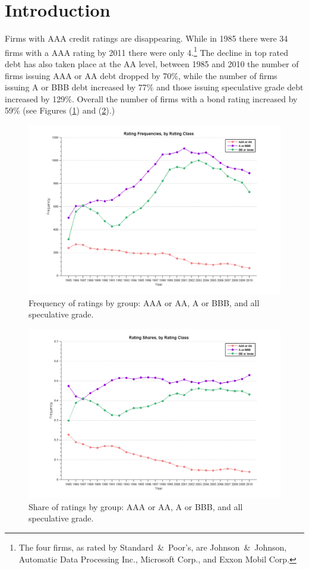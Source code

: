 \documentclass[titlepage]{article}
\begin{document}
\section{Introduction}
Firms with AAA credit ratings are disappearing. While in 1985 there were 34 firms with a AAA rating by 2011 there were only 4.\footnote{The four firms, as rated by Standard~\&~Poor's, are Johnson~\&~Johnson, Automatic Data Processing Inc., Microsoft Corp., and Exxon Mobil Corp.} The decline in top rated debt has also taken place at the AA level, between 1985 and 2010 the number of firms issuing AAA or AA debt dropped by 70\%, while the number of firms issuing A or BBB debt increased by 77\% and those issuing speculative grade debt increased by 129\%. Overall the number of firms with a bond rating increased by 59\% (see Figures (\ref{fig:count}) and (\ref{fig:share}).)

\begin{figure}[ht]
\centering
\includegraphics[width=\textwidth]{rate_freq.png}
\caption{Frequency of ratings by group: AAA or AA, A or BBB, and all speculative grade.}
\label{fig:count}
\end{figure}

\begin{figure}[ht]
\centering
\includegraphics[width=\textwidth]{rate_share.png}
\caption{Share of ratings by group: AAA or AA, A or BBB, and all speculative grade.}
\label{fig:share}
\end{figure}
\end{document}
